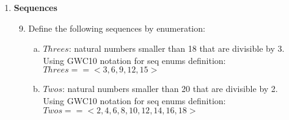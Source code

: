 \documentclass{article}
\begin{document}
\begin{enumerate}[\bf I.]
\item \textbf{Sequences}


\begin{enumerate}[1.]\setcounter{enumii}{8}

\item Define the following sequences by enumeration:
\begin{enumerate}[a.]
\item $Threes$: natural numbers smaller than 18 that are divisible by 3. \\
  Using GWC10 notation for seq enums definition: \\
  $Threes== <3 , 6 ,  9 , 12 , 15>$ \\
\item  $Twos$: natural numbers smaller than 20 that are divisible by 2. \\
  Using GWC10 notation for seq enums definition: \\
  $Twos== <2 , 4 , 6 , 8 , 10 , 12 , 14 , 16 , 18>$ \\
\end{enumerate}


\end{enumerate}
\end{enumerate}
\end{document}
